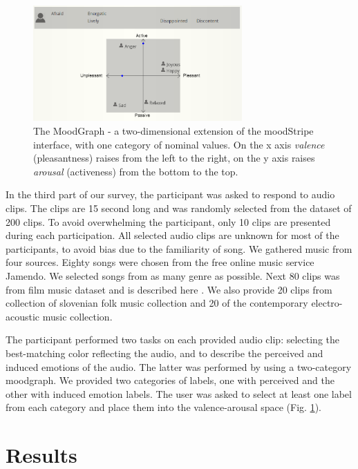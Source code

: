 \documentclass[a4paper]{article}
\begin{document}
\begin{figure}[ht]
\centering
\includegraphics[width=80mm]{moodgraph.png}
\caption{The MoodGraph - a two-dimensional extension of the moodStripe interface, with one category of nominal values. On the x axis \textit{valence} (pleasantness) raises from the left to the right, on the y axis raises \textit{arousal} (activeness) from the bottom to the top.}
\label{moodgraph}
\end{figure}

In the third part of our survey, the participant was asked to respond to audio clips. The clips are 15 second long and was randomly selected from the dataset of 200 clips. To avoid overwhelming the participant, only 10 clips are presented during each participation. All selected audio clips are unknown for most of the participants, to avoid bias due to the familiarity of song. We gathered music from four sources. Eighty songs were chosen from the free online music service Jamendo. We selected songs from as many genre as possible. Next 80 clips was from film music dataset and is described here \cite{eerola2010comparison}. We also provide 20 clips from collection of slovenian folk music collection and 20 of the contemporary electro-acoustic music collection. 

The participant performed two tasks on each provided audio clip: selecting the best-matching color reflecting the audio, and to describe the perceived and induced emotions of the audio. The latter was performed by using a two-category moodgraph. We provided two categories of labels, one with perceived and the other with induced emotion labels. The user was asked to select at least one label from each category and place them into the valence-arousal space (Fig. \ref{moodgraph}). 

\section{Results}
\end{document}

